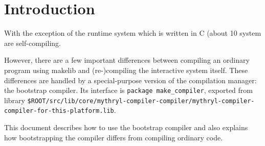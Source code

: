 
\section{Introduction}

With the exception of the runtime system which is written in C
(about 10%
system are self-compiling.

However, there are a few important differences between compiling an
ordinary program using makelib and (re-)compiling the interactive system
itself.  These differences are handled by a special-purpose version of
the compilation manager: the bootstrap compiler.  Its interface is
{\tt package make_compiler}, exported from library {\tt \$ROOT/src/lib/core/mythryl-compiler-compiler/mythryl-compiler-compiler-for-this-platform.lib}.

This document describes how to use the bootstrap compiler and also
explains how bootstrapping the compiler differs from compiling
ordinary code.
